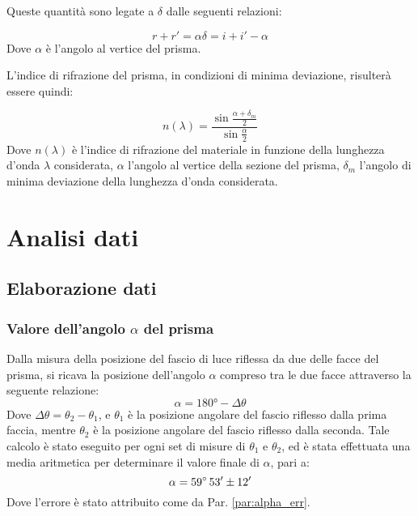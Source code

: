 \documentclass[]{article}
\let\oldsection\section%
\renewcommand{\section}{%
	\renewcommand{\theequation}{\thesection.\arabic{equation}}%
	\oldsection}%
\let\oldsubsection\subsection%
\renewcommand{\subsection}{%
	\renewcommand{\theequation}{\thesubsection.\arabic{equation}}%
	\oldsubsection}%
\begin{document}
    Queste quantità sono legate a $\delta$ dalle seguenti relazioni:

    \begin{equation}
        \label{relazioni_delta}
        r + r' = \alpha
        \delta = i + i' - \alpha
    \end{equation}
    Dove $\alpha$ è l'angolo al vertice del prisma.

    L'indice di rifrazione del prisma, in condizioni di minima deviazione, risulterà essere quindi:

    \begin{equation}
        \label{indice_rifrazione}
        n(\lambda)=\frac{\sin \frac{\alpha + \delta _m} {2}}{\sin \frac{\alpha}{2}}
    \end{equation}
    Dove $n(\lambda)$ è l'indice di rifrazione del materiale in funzione della lunghezza d'onda $\lambda$ considerata, $\alpha$ l'angolo al vertice della sezione del prisma, $\delta _m $ l'angolo di minima deviazione della lunghezza d'onda considerata.


    \section{Analisi dati}
    \subsection{Elaborazione dati}
    \subsubsection{Valore dell'angolo $\alpha$ del prisma}
    Dalla misura della posizione del fascio di luce riflessa da due delle facce del prisma, si ricava la posizione dell'angolo $\alpha$ compreso tra le due facce attraverso la seguente relazione:
    \begin{equation}
        \label{alpha}
        \alpha = 180° - \Delta\theta
    \end{equation}
    Dove $\Delta\theta=\theta_2-\theta_1$, e $\theta_1$ è la posizione angolare del fascio riflesso dalla prima faccia, mentre $\theta_2$ è la posizione angolare del fascio riflesso dalla seconda.
    Tale calcolo è stato eseguito per ogni set di misure di $\theta_1$ e $\theta_2$, ed è stata effettuata una media aritmetica per determinare il valore finale di $\alpha$, pari a: 
    \begin{equation}
        \label{alpha-value}
        \alpha = 59 \degree \, 53' \pm 12'
    \end{equation}
    Dove l'errore è stato attribuito come da Par. \ref{par:alpha_err}.
\end{document}
